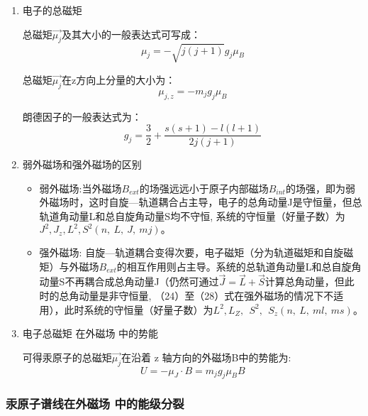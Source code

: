 \documentclass[dvipsnames, svgnames,a4paper,11pt]{article}
\begin{document}
	\begin{enumerate}
		\item 电子的总磁矩
		
			总磁矩$\vec{\mu_j}$及其大小的一般表达式可写成：
				\[
					\mu_j = -\sqrt{j(j+1)}g_j \mu_B
				\]

			总磁矩$\vec{\mu_j}$在z方向上分量的大小为：
				\[
					\mu_{j,z} = - m_j g_j \mu_B	
				\]

			朗德因子的一般表达式为：
				\[
					g_j=\frac{3}{2}+\frac{s\left(s+1\right)-l\left(l+1\right)}{2j\left(j+1\right)}	
				\]

		\item 弱外磁场和强外磁场的区别
		
			\begin{itemize}
				\item 弱外磁场:当外磁场$B_{ext}$的场强远远小于原子内部磁场$B_{int}$的场强，即为弱外磁场时，这时自旋—轨道耦合占主导，电子的总角动量J是守恒量，但总轨道角动量L和总自旋角动量S均不守恒, 系统的守恒量（好量子数）为$J^2,J_z,L^2,S^2\left(n,\ L,\ J,\ mj\right)。$
				\item 强外磁场: 自旋—轨道耦合变得次要，电子磁矩（分为轨道磁矩和自旋磁矩）与外磁场$B_{ext}$的相互作用则占主导。系统的总轨道角动量L和总自旋角动量S不再耦合成总角动量J（仍然可通过$\vec{J}=\vec{L}+\vec{S}$计算总角动量，但此时的总角动量是非守恒量, （24）至（28）式在强外磁场的情况下不适用），此时系统的守恒量（好量子数）为$L^2,L_Z,\ \ S^2,\ {\ S}_z\left(n,\ L,\ ml,\ ms\right)$。
			\end{itemize}
		
		\item 电子总磁矩 在外磁场 中的势能
		
			可得汞原子的总磁矩$\vec{\mu_j}$在沿着 z 轴方向的外磁场B中的势能为:
			\[
				U=-\mu_J \cdot B=m_jg_j\mu_B B	
			\]


	\end{enumerate}





\subsubsection{汞原子谱线在外磁场 中的能级分裂}
\end{document}
